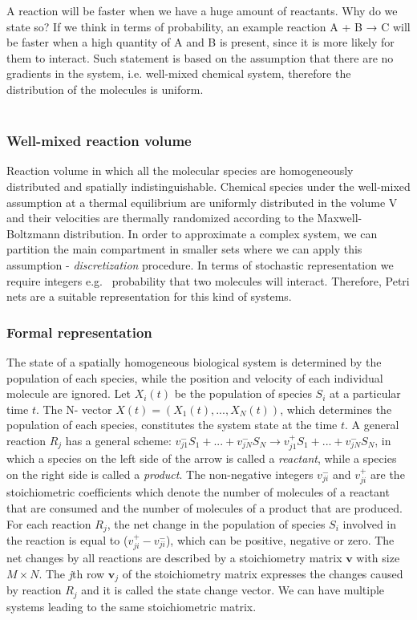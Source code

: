 \noindent
A reaction will be faster when we have a huge amount of reactants.
Why do we state so? If we think in terms of probability, an example reaction A + B → C will be faster when a high quantity of A and B is present, since it is more likely for them to interact.
Such statement is based on the assumption that there are no gradients in the system, i.e. well-mixed chemical system, therefore the distribution of the molecules is uniform.
\\
\\
\noindent
\subsubsection{Well-mixed reaction volume}
Reaction volume in which all the molecular species are homogeneously distributed and spatially indistinguishable.
Chemical species under the well-mixed assumption at a thermal equilibrium are uniformly distributed in the volume V and their velocities are thermally randomized according to the Maxwell-Boltzmann distribution.
In order to approximate a complex system, we can partition the main compartment in smaller sets where we can apply this assumption - \emph{discretization} procedure.
In terms of stochastic representation we require integers e.g. ~probability that two molecules will interact.
Therefore, Petri nets are a suitable representation for this kind of systems.
\subsubsection{Formal representation} 
The state of a spatially homogeneous biological system is determined by the population of each species, while the position and velocity of each individual molecule are ignored.
Let $X_i(t)$ be the population of species $S_i$ at a particular time $t$.
The N- vector $X(t) = (X_1(t),...,X_N(t))$, which determines the population of each species, constitutes the system state at the time $t$.
A general reaction $R_j$ has a general scheme: $v^-_{j1}S_1+...+v^-_{jN}S_N \rightarrow v^+_{j1}S_1+...+v^-_{jN}S_N$, in which a species on the left side of the arrow is called a \emph{reactant}, while a species on the right side is called a \emph{product}.
The non-negative integers $v^-_{ji}$ and $v^+_{ji}$ are the stoichiometric coefficients which denote the number of molecules of a reactant that are consumed and the number of molecules of a product that are produced.
For each reaction $R_j$, the net change in the population of species $S_i$ involved in the reaction is equal to ($v^+_{ji}- v^-_{ji}$), which can be positive, negative or zero.
The net changes by all reactions are described by a stoichiometry matrix $\mathbf{v}$ with size $M × N$.
The \emph{j}th row $\mathbf{v}_j$ of the stoichiometry matrix expresses the changes caused by reaction $R_j$ and it is called the state change vector.
We can have multiple systems leading to the same stoichiometric matrix.

